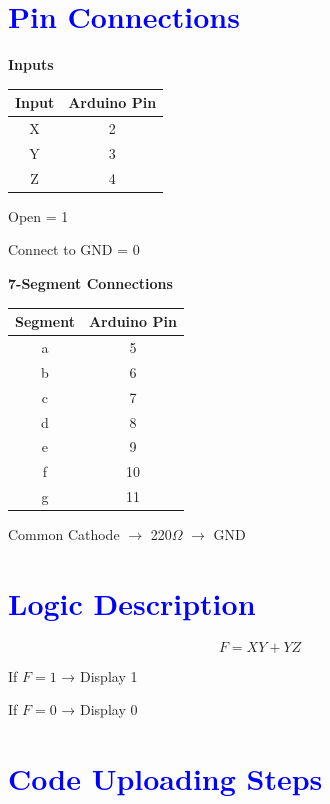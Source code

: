 \documentclass[12pt,a4paper]{article}
\begin{document}
\section*{\textcolor{blue}{Pin Connections}}

\textbf{Inputs}

\begin{center}
\begin{tabular}{|c|c|}
\hline
Input & Arduino Pin \\
\hline
X & 2 \\
Y & 3 \\
Z & 4 \\
\hline
\end{tabular}
\end{center}

Open = 1  

Connect to GND = 0  

\vspace{10pt}

\textbf{7-Segment Connections}

\begin{center}
\begin{tabular}{|c|c|}
\hline
Segment & Arduino Pin \\
\hline
a & 5 \\
b & 6 \\
c & 7 \\
d & 8 \\
e & 9 \\
f & 10 \\
g & 11 \\
\hline
\end{tabular}
\end{center}

Common Cathode $\rightarrow$ 220$\Omega$ $\rightarrow$ GND

\section*{\textcolor{blue}{Logic Description}}

\[
F = XY + YZ
\]

If $F=1$ → Display 1  

If $F=0$ → Display 0  

\section*{\textcolor{blue}{Code Uploading Steps}}
\end{document}
